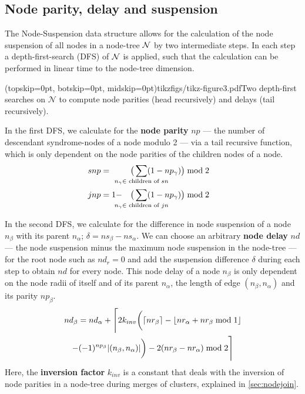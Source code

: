 \subsection{Node parity, delay and suspension}\label{sec:paritydelaysus}

The Node-Suspension data structure allows for the calculation of the node suspension of all nodes in a node-tree $\mathcal{N}$ by two intermediate steps. In each step a depth-first-search (DFS) of $\mathcal{N}$ is applied, such that the calculation can be performed in linear time to the node-tree dimension.

\Figure[b](topskip=0pt, botskip=0pt, midskip=0pt){tikzfigs/tikz-figure3.pdf}{Two depth-first searches on $\mathcal{N}$ to compute node parities (head recursively) and delays (tail recursively).\label{fig3}}

In the first DFS, we calculate for the \textbf{node parity} $np$ --- the number of descendant syndrome-nodes of a node modulo 2 --- via a tail recursive function, which is only dependent on the node parities of the children nodes of a node.
\begin{align}\label{eq:nodeparity}
    snp &= &\big( \sum_{\mathclap{n_\gamma \in \text{ children of } sn}} (1-np_\gamma) \big ) \bmod 2 \hspace{1em}  \\
    jnp &= 1 - &\big(\sum_{\mathclap{n_\gamma \in \text{ children of } jn}} (1-np_\gamma) \big) \bmod 2 \hspace{1em}
\end{align}

In the second DFS, we calculate for the difference in node suspension of a node $n_\beta$ with its parent $n_\alpha$; $\delta = ns_\beta - ns_\alpha$. We can choose an arbitrary \textbf{node delay} $nd$ --- the node suspension minus the maximum node suspension in the node-tree --- for the root node such as $nd_r=0$ and add the suspension difference $\delta$ during each step to obtain $nd$ for every node. This node delay of a node $n_\beta$ is only dependent on the node radii of itself and of its parent $n_\alpha$, the length of edge $(n_\beta, n_\alpha)$ and its parity $np_\beta$. 
\begin{multline}\label{eq:delayequation}
    nd_\beta = nd_\alpha + \Bigg \lceil 2k_{inv}\bigg(\ceil{nr_\beta} - \floor{nr_\alpha + nr_\beta \bmod 1}\\
    - (-1)^{np_\beta}\abs{(n_\beta,n_\alpha)}\bigg) - 2(nr_\beta - nr_\alpha) \bmod2 \Bigg \rceil
\end{multline}
Here, the \textbf{inversion factor} $k_{inv}$ is a constant that deals with the inversion of node parities in a node-tree during merges of clusters, explained in \ref{sec:nodejoin}. 

